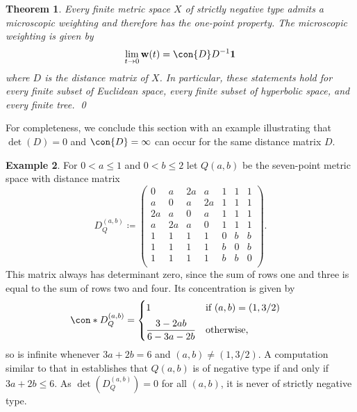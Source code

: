 \documentclass[a4paper, oneside, reqno]{amsart}
\newtheorem{theorem}{Theorem}[section]
\theoremstyle{definition}
\newtheorem{example}[theorem]{Example}
\theoremstyle{remark}
\numberwithin{equation}{section}
\renewcommand{\vec}{\mathbf}
\newcommand{\onevector}{\mathbf{1}}
\begin{document}
\begin{theorem}
\label{thm:strict_negative_type_microwtg}
Every finite metric space \(X\) of strictly negative type admits a microscopic weighting and therefore has the one-point property. The microscopic weighting is given by
\[\lim_{t \to 0} \vec{w}(t) = \con{D} D^{-1} \onevector\]
where \(D\) is the distance matrix of \(X\). In particular, these statements hold for every finite subset of Euclidean space, every finite subset of hyperbolic space, and every finite tree. \qed
\end{theorem}

For completeness, we conclude this section with an example illustrating that \(\det(D) = 0\) and \(\con{D} = \infty\) can occur for the same distance matrix \(D\).

\begin{example}
\label{eg:seven-points}
For \(0 < a \le 1\) and \(0 < b \le 2\) let \(Q(a, b)\) be the seven-point metric space with distance matrix
\[
    D_Q^{(a, b)}
    \coloneq
    \begin{pmatrix}
        0 & a & 2a & a & 1 & 1 & 1 \\
        a & 0 & a & 2a & 1 & 1 & 1 \\
        2a & a & 0 & a & 1 & 1 & 1 \\
        a & 2a & a & 0 & 1 & 1 & 1 \\
        1 & 1 & 1 & 1 & 0 & b & b \\
        1 & 1 & 1 & 1 & b & 0 & b \\
        1 & 1 & 1 & 1 & b & b & 0 \\
    \end{pmatrix}.
\]
This matrix always has determinant zero, since the sum of rows one and three is equal to the sum of rows two and four. Its concentration is given by
     \begin{align*}
        \con*{D_Q^{(a, b)}} &= 
        \begin{cases}
            1
            &
            \text{if } (a, b) = (1, 3/2)
            \\[0.5em]
            \dfrac{3 - 2ab}{6 - 3a - 2b}
            &
            \text{otherwise,}
        \end{cases}
    \end{align*}
    so is infinite whenever \(3a+2b = 6\) and \((a,b) \neq (1,3/2)\). A computation similar to that in  establishes that \(Q(a, b)\) is of negative type if and only if \(3a + 2b \le 6\). As \(\det(D_Q^{(a,b)})=0\) for all \((a,b)\), it is never of strictly negative type. 
\end{example}
\end{document}
